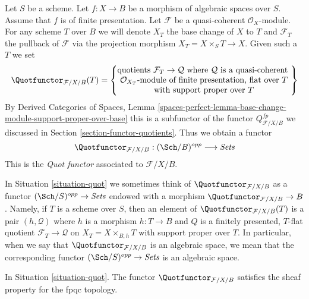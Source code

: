 \begin{situation}
\label{situation-quot}
Let $S$ be a scheme. Let $f : X \to B$ be a morphism of
algebraic spaces over $S$. Assume that $f$ is of finite presentation.
Let $\mathcal{F}$ be a quasi-coherent $\mathcal{O}_X$-module.
For any scheme $T$ over $B$ we will denote $X_T$ the base change of
$X$ to $T$ and $\mathcal{F}_T$ the pullback
of $\mathcal{F}$ via the projection morphism $X_T = X \times_S T \to X$.
Given such a $T$ we set
$$
\Quotfunctor_{\mathcal{F}/X/B}(T) =
\left\{
\begin{matrix}
\text{quotients }\mathcal{F}_T \to \mathcal{Q}\text{ where }
\mathcal{Q}\text{ is a quasi-coherent }\\
\mathcal{O}_{X_T}\text{-module of finite presentation, flat over }T\\
\text{with support proper over }T
\end{matrix}
\right\}
$$
By Derived Categories of Spaces, Lemma
\ref{spaces-perfect-lemma-base-change-module-support-proper-over-base}
this is a subfunctor of the functor $Q^{fp}_{\mathcal{F}/X/B}$
we discussed in Section \ref{section-functor-quotients}.
Thus we obtain a functor
\begin{equation}
\label{equation-quot}
\Quotfunctor_{\mathcal{F}/X/B} : (\Sch/B)^{opp} \longrightarrow \textit{Sets}
\end{equation}
This is the {\it Quot functor} associated to $\mathcal{F}/X/B$.
\end{situation}

\noindent
In Situation \ref{situation-quot} we sometimes think of
$\Quotfunctor_{\mathcal{F}/X/B}$ as a functor
$(\Sch/S)^{opp} \to \textit{Sets}$ endowed
with a morphism $\Quotfunctor_{\mathcal{F}/X/B} \to B$.
Namely, if $T$ is a scheme over $S$, then an element
of $\Quotfunctor_{\mathcal{F}/X/B}(T)$ is a pair $(h, \mathcal{Q})$
where $h$ is a morphism $h : T \to B$
and $Q$ is a finitely presented, $T$-flat quotient
$\mathcal{F}_T \to \mathcal{Q}$ on $X_T = X \times_{B, h} T$
with support proper over $T$. In particular, when we say
that $\Quotfunctor_{\mathcal{F}/X/B}$ is an algebraic space, we mean that the
corresponding functor $(\Sch/S)^{opp} \to \textit{Sets}$ is an algebraic space.

\begin{lemma}
\label{lemma-quot-sheaf}
In Situation \ref{situation-quot}. The functor $\Quotfunctor_{\mathcal{F}/X/B}$
satisfies the sheaf property for the fpqc topology.
\end{lemma}

